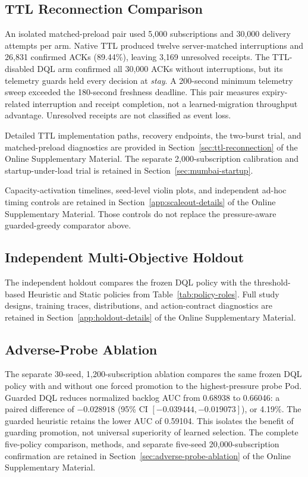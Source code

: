 \subsection{TTL Reconnection Comparison}
An isolated matched-preload pair used 5,000 subscriptions and 30,000 delivery
attempts per arm. Native TTL produced twelve server-matched interruptions and
26,831 confirmed ACKs (89.44\%), leaving 3,169 unresolved receipts. The
TTL-disabled DQL arm confirmed all 30,000 ACKs without interruptions, but its
telemetry guards held every decision at \emph{stay}. A 200-second minimum
telemetry sweep exceeded the 180-second freshness deadline. This pair measures
expiry-related interruption and receipt completion, not a learned-migration
throughput advantage. Unresolved receipts are not classified as event loss.

Detailed TTL implementation paths, recovery endpoints, the two-burst trial,
and matched-preload diagnostics are provided in
Section~\ref{sec:ttl-reconnection} of the Online Supplementary Material.
The separate 2,000-subscription calibration and startup-under-load trial is
retained in Section~\ref{sec:mumbai-startup}.

Capacity-activation timelines, seed-level violin plots, and independent
ad-hoc timing controls are retained in Section~\ref{app:scaleout-details} of
the Online Supplementary Material. Those controls do not replace the
pressure-aware guarded-greedy comparator above.

\subsection{Independent Multi-Objective Holdout}
The independent holdout compares the frozen DQL policy with the threshold-based
Heuristic and Static policies from Table~\ref{tab:policy-roles}. Full study
designs, training traces, distributions, and action-contract diagnostics are
retained in Section~\ref{app:holdout-details} of the Online Supplementary Material.

\subsection{Adverse-Probe Ablation}
The separate 30-seed, 1,200-subscription ablation compares the same frozen DQL
policy with and without one forced promotion to the highest-pressure probe
Pod. Guarded DQL reduces normalized backlog AUC from 0.68938 to 0.66046:
a paired difference of $-0.028918$ (95\% CI $[-0.039444,-0.019073]$), or 4.19\%.
The guarded heuristic retains the lower AUC of 0.59104. This isolates the
benefit of guarding promotion, not universal superiority of learned selection.
The complete five-policy comparison, methods, and separate five-seed
20,000-subscription confirmation are retained in
Section~\ref{sec:adverse-probe-ablation} of the Online Supplementary Material.

